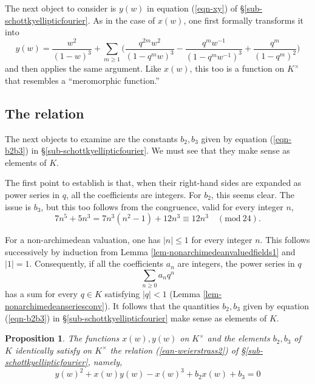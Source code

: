 \documentclass[a4paper,12pt, dvipdfmx]{jsbook}
\newcommand{\abs}[1]{\lvert#1\rvert}
\theoremstyle{plain}
\newtheorem{prop}[thm]{\bfseries Proposition}
\theoremstyle{definition}
\begin{document}
The next object to consider is $y(w)$ in equation (\ref{eqn-xy}) of \S\ref{sub-schottkyellipticfourier}.
As in the case of $x(w)$, one first formally transforms it into
\begin{equation}\label{eqn-y1}
y(w)=\frac{w^2}{(1-w)^3}+\sum_{m\geq 1}\bigg(\frac{q^{2m}w^2}{(1-q^mw)^3}-\frac{q^mw^{-1}}{(1-q^mw^{-1})^3}+\frac{q^m}{(1-q^m)^2}\bigg)
\end{equation}
and then applies the same argument.
Like $x(w)$, this too is a function on $K^{\times}$ that resembles a ``meromorphic function.''

\subsection{The relation}\label{sub-relationxy}
The next objects to examine are the constants $b_2,b_3$ given by equation (\ref{eqn-b2b3}) in \S\ref{sub-schottkyellipticfourier}.
We must see that they make sense as elements of $K$.

The first point to establish is that, when their right-hand sides are expanded as power series in $q$, all the coefficients are integers.
For $b_2$, this seems clear.
The issue is $b_3$, but this too follows from the congruence, valid for every integer $n$,
$$
7n^5+5n^3=7n^3(n^2-1)+12n^3\equiv 12n^3\quad(\textrm{mod}\ 24).
$$

For a non-archimedean valuation, one has $\abs{n}\leq 1$ for every integer $n$.
This follows successively by induction from Lemma \ref{lem-nonarchimedeanvaluedfields1} and $\abs{1}=1$.
Consequently, if all the coefficients $a_n$ are integers, the power series in $q$
$$
\sum_{n\geq 0}a_nq^n
$$
has a sum for every $q\in K$ satisfying $\abs{q}<1$ (Lemma \ref{lem-nonarchimedeanseriesconv}).
It follows that the quantities $b_2,b_3$ given by equation (\ref{eqn-b2b3}) in \S\ref{sub-schottkyellipticfourier} make sense as elements of $K$.

\begin{prop}\label{prop-relationxy}{\rm 
The functions $x(w),y(w)$ on $K^{\times}$ and the elements $b_2,b_3$ of $K$ identically satisfy on $K^{\times}$ the relation (\ref{ean-weierstrass2}) of \S\ref{sub-schottkyellipticfourier}, namely,
\begin{equation}\label{ean-weierstrass21}
y(w)^2+x(w)y(w)-x(w)^3+b_2x(w)+b_3=0%
\end{equation}}
\end{prop}
\end{document}
